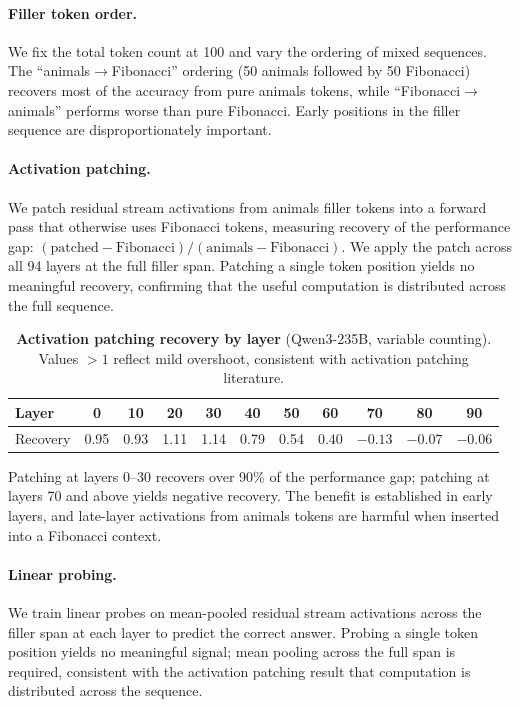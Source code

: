 \documentclass{article}
\begin{document}
\paragraph{Filler token order.} We fix the total token count at 100 and vary the ordering of mixed sequences. The ``animals$\to$Fibonacci'' ordering (50 animals followed by 50 Fibonacci) recovers most of the accuracy from pure animals tokens, while ``Fibonacci$\to$animals'' performs worse than pure Fibonacci. Early positions in the filler sequence are disproportionately important.

\paragraph{Activation patching.} We patch residual stream activations from animals filler tokens into a forward pass that otherwise uses Fibonacci tokens, measuring recovery of the performance gap: $(\text{patched} - \text{Fibonacci}) / (\text{animals} - \text{Fibonacci})$. We apply the patch across all 94 layers at the full filler span. Patching a single token position yields no meaningful recovery, confirming that the useful computation is distributed across the full sequence.

\begin{table}[h]
\centering
\caption{\textbf{Activation patching recovery by layer} (Qwen3-235B, variable counting). Values $>1$ reflect mild overshoot, consistent with activation patching literature.}
\label{tab:act_patch}
\small
{}
\begin{tabular}{@{}lcccccccccc@{}}
\toprule
\textbf{Layer} & 0 & 10 & 20 & 30 & 40 & 50 & 60 & 70 & 80 & 90 \\
\midrule
Recovery & 0.95 & 0.93 & 1.11 & 1.14 & 0.79 & 0.54 & 0.40 & $-0.13$ & $-0.07$ & $-0.06$ \\
\bottomrule
\end{tabular}
\end{table}

Patching at layers 0--30 recovers over 90\% of the performance gap; patching at layers 70 and above yields negative recovery. The benefit is established in early layers, and late-layer activations from animals tokens are harmful when inserted into a Fibonacci context.

\paragraph{Linear probing.} We train linear probes on mean-pooled residual stream activations across the filler span at each layer to predict the correct answer. Probing a single token position yields no meaningful signal; mean pooling across the full span is required, consistent with the activation patching result that computation is distributed across the sequence.
\end{document}
